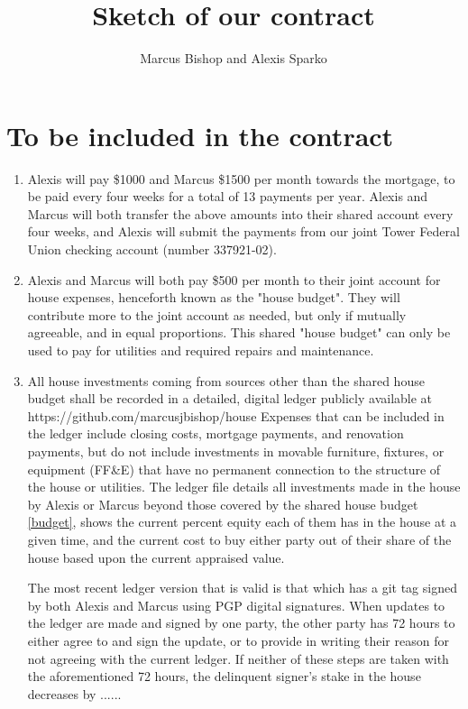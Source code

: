 \documentclass[12pt]{article}
\title{Sketch of our contract}
\author{Marcus Bishop and Alexis Sparko}
\begin{document}
\maketitle

\section{To be included in the contract}
\begin{enumerate}

\item Alexis will pay \$1000 and Marcus \$1500 per 
month towards the mortgage, to be paid every four weeks for a total of 13 payments per year. 
Alexis and Marcus will both transfer the above amounts into their shared account every four weeks, 
and Alexis will submit the payments from our joint Tower Federal Union checking account (number 337921-02).

\item\label{budget} Alexis and Marcus will both pay \$500 per month to their joint account for house 
expenses, henceforth known as the "house budget". They will contribute more to the joint account as needed, but 
only if mutually agreeable, and in equal proportions. This shared "house budget" can only be used to pay for utilities and required repairs and maintenance.

\item\label{ledger} All house investments coming from sources other than the shared house budget shall be recorded in a detailed, digital ledger publicly available at
https://github.com/marcusjbishop/house
Expenses that can be included in the ledger include closing costs, mortgage payments, and renovation payments, but do not include investments in movable furniture, fixtures, or equipment (FF&E) that have no permanent connection to the structure of the house or utilities.
The ledger file details all investments made in the house by Alexis or Marcus beyond those covered by the shared house budget \autoref{budget}, shows 
the current percent equity each of them has in the house at a given time, and the current cost to buy either party out of their share of the house based upon the current appraised value.

The most recent ledger version that is valid is that which has a git tag signed by both Alexis and Marcus using PGP digital signatures.
When updates to the ledger are made and signed by one party, the other party has 72 hours to either agree to and sign the update, or to provide in writing their reason for not agreeing with the current ledger. If neither of these steps are taken with the aforementioned 72 hours, the delinquent signer's stake in the house decreases by ......



\end{enumerate}
\end{document}
